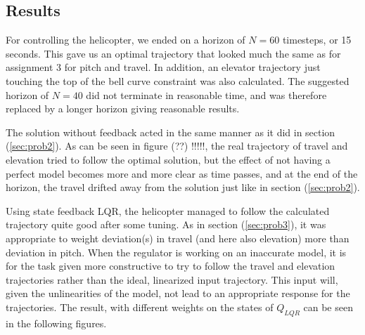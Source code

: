 
\subsection{Results}

For controlling the helicopter, we ended on a horizon of $N=60$ timesteps, or 15 seconds. This gave us an optimal trajectory that looked much the same as for assignment 3 for pitch and travel. In addition, an elevator trajectory just touching the top of the bell curve constraint was also calculated. The suggested horizon of $N=40$ did not terminate in reasonable time, and was therefore replaced by a longer horizon giving reasonable results.%

The solution without feedback acted in the same manner as it did in section (\ref{sec:prob2}). As can be seen in figure (??) !!!!!, the real trajectory of travel and elevation tried to follow the optimal solution, but the effect of not having a perfect model becomes more and more clear as time passes, and at the end of the horizon, the travel drifted away from the solution just like in section (\ref{sec:prob2}).

Using state feedback LQR, the helicopter managed to follow the calculated trajectory quite good after some tuning. As in section (\ref{sec:prob3}), it was appropriate to weight deviation(s) in travel (and here also elevation) more than deviation in pitch. When the regulator is working on an inaccurate model, it is for the task given more constructive to try to follow the travel and elevation trajectories rather than the ideal, linearized input trajectory. This input will, given the unlinearities of the model, not lead to an appropriate response for the trajectories. The result, with different weights on the states of $Q_{LQR}$ can be seen in the following figures. %


